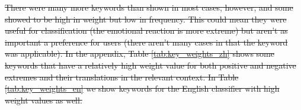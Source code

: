 \documentclass[smallextended,natbib]{svjour3}       %
\providecommand{\DIFdel}[1]{{\protect\color{red}\sout{#1}}}                      %
\providecommand{\DIFdelbegin}{} %
\newcommand{\DIFscaledelfig}{0.5}
\newlength{\DIFdelgraphicswidth} %
\newlength{\DIFdelgraphicsheight} %
\newcommand{\DIFdelincludegraphics}[2][]{%
\sbox{\DIFdelgraphicsbox}{\DIFOincludegraphics[#1]{#2}}%
\settoboxwidth{\DIFdelgraphicswidth}{\DIFdelgraphicsbox} %
\settoboxtotalheight{\DIFdelgraphicsheight}{\DIFdelgraphicsbox} %
\scalebox{\DIFscaledelfig}{%
\parbox[b]{\DIFdelgraphicswidth}{\usebox{\DIFdelgraphicsbox}\\[-\baselineskip] \rule{\DIFdelgraphicswidth}{0em}}\llap{\resizebox{\DIFdelgraphicswidth}{\DIFdelgraphicsheight}{%
\setlength{\unitlength}{\DIFdelgraphicswidth}%
\begin{picture}(1,1)%
\thicklines\linethickness{2pt} %
{\color[rgb]{1,0,0}\put(0,0){\framebox(1,1){}}}%
{\color[rgb]{1,0,0}\put(0,0){\line( 1,1){1}}}%
{\color[rgb]{1,0,0}\put(0,1){\line(1,-1){1}}}%
\end{picture}%
}\hspace*{3pt}}} %
} %
\DeclareRobustCommand{\DIFdelbegin}{\DIFOdelbegin \let\includegraphics\DIFdelincludegraphics} %
\begin{document}
\DIFdelbegin \DIFdel{There were many more keywords than shown in most cases, however, and some showed to be high in weight but low in frequency. This could mean they were useful for classification (the emotional reaction is more extreme) but aren't as important a preference for users (there aren't many cases in that the keyword was applicable). In the appendix, Table \ref{tab:key_weights_zh} shows some keywords that have a relatively high weight value for both positive and negative extremes and their translations in the relevant context. In Table \ref{tab:key_weights_en} we show keywords for the English classifier with high weight values as well.
}


\begin{table}[h]
\centering
\caption{Top 10 positive keywords in positive sentences}
\label{tab:pos_keys}
\end{table}
\end{document}

